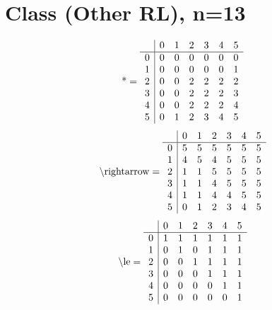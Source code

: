 \documentclass[11pt]{article}
\begin{document}
\section{Class (Other RL), n=13}
\[\text{*} = 
\begin{array}{r | r r r r r r}
 & 0 & 1 & 2 & 3 & 4 & 5 \\ \hline
0 & 0 & 0 & 0 & 0 & 0 & 0 \\
1 & 0 & 0 & 0 & 0 & 0 & 1 \\
2 & 0 & 0 & 2 & 2 & 2 & 2 \\
3 & 0 & 0 & 2 & 2 & 2 & 3 \\
4 & 0 & 0 & 2 & 2 & 2 & 4 \\
5 & 0 & 1 & 2 & 3 & 4 & 5 \\
\end{array}
\]
\[\text{\textbackslash rightarrow} = 
\begin{array}{r | r r r r r r}
 & 0 & 1 & 2 & 3 & 4 & 5 \\ \hline
0 & 5 & 5 & 5 & 5 & 5 & 5 \\
1 & 4 & 5 & 4 & 5 & 5 & 5 \\
2 & 1 & 1 & 5 & 5 & 5 & 5 \\
3 & 1 & 1 & 4 & 5 & 5 & 5 \\
4 & 1 & 1 & 4 & 4 & 5 & 5 \\
5 & 0 & 1 & 2 & 3 & 4 & 5 \\
\end{array}
\]
\[\text{\textbackslash le} = 
\begin{array}{r | r r r r r r}
 & 0 & 1 & 2 & 3 & 4 & 5 \\ \hline
0 & 1 & 1 & 1 & 1 & 1 & 1 \\
1 & 0 & 1 & 0 & 1 & 1 & 1 \\
2 & 0 & 0 & 1 & 1 & 1 & 1 \\
3 & 0 & 0 & 0 & 1 & 1 & 1 \\
4 & 0 & 0 & 0 & 0 & 1 & 1 \\
5 & 0 & 0 & 0 & 0 & 0 & 1 \\
\end{array}
\]
\end{document}

